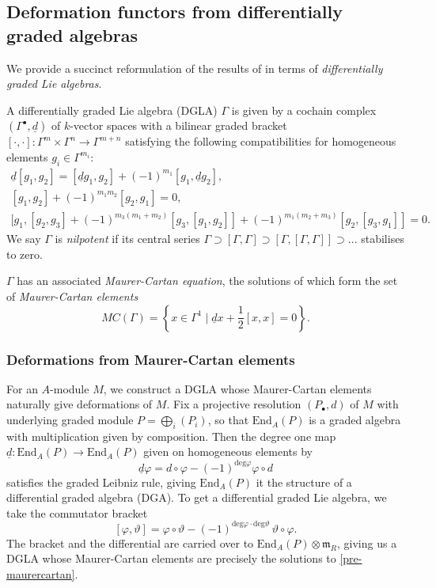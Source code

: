 \subsection{Deformation functors from differentially graded algebras}
\label{subsec-defbydga}
We provide a succinct reformulation of  the results of
 in terms of \textit{differentially graded Lie algebras}. 

\begin{definition} A differentially graded Lie algebra (DGLA) \(\Gamma\) 
    is given by a cochain complex \((\Gamma^\bullet,\underline{d})\) of \(k\)-vector
    spaces with a bilinear graded bracket \([\cdot,\cdot]: \Gamma^m \times \Gamma^n
    \rightarrow \Gamma^{m+n}\) satisfying the following compatibilities for
    homogeneous elements \(g_i\in \Gamma^{m_i}\): 
    \begin{gather*}
        \underline{d}[g_1,g_2] = [\underline{d}g_1,g_2] + (-1)^{m_1}
        [g_1,\underline{d}g_2],\\
        [g_1,g_2] + (-1)^{m_1m_2}[g_2,g_1]=0,\\
        [g_1,[g_2,g_3]+(-1)^{m_3(m_1+m_2)}[g_3,[g_1,g_2]] +
        (-1)^{m_1(m_2+m_3)}[g_2,[g_3,g_1]]=0.
    \end{gather*}
    We say \(\Gamma\) is \textit{nilpotent} if its central series
    \(\Gamma\supset [\Gamma,\Gamma]\supset [\Gamma,[\Gamma,\Gamma]]\supset ...\)
    stabilises to zero.  

    \(\Gamma\) has an associated \textit{Maurer-Cartan equation}, the solutions
    of which form the set of \textit{Maurer-Cartan elements} \[MC(\Gamma) =
    \left\{x\in \Gamma^1\;|\; \underline{d}x+\frac{1}{2}[x,x]=0\right\}.\]
\end{definition}

\subsubsection{Deformations from Maurer-Cartan elements} For an \(A\)-module
\(M\), we construct a DGLA whose Maurer-Cartan elements naturally give
deformations of \(M\). Fix a projective resolution \((P_\bullet,d)\) of \(M\)
with underlying graded module \(P=\bigoplus_i(P_i)\), so that
\(\text{End}_A(P)\) is a graded algebra with multiplication given by
composition. Then the degree one map \(\underline{d}:\text{End}_A(P)\rightarrow
\text{End}_A(P)\) given on homogeneous elements by 
\[\underline{d}\varphi = d \circ \varphi
-(-1)^{\text{deg}\varphi} \varphi \circ d\]
satisfies the graded Leibniz rule, giving \(\text{End}_A(P)\) it the structure
of a differential graded algebra (DGA). To get a differential graded Lie algebra, we
take the commutator bracket 
\[[\varphi, \vartheta] = \varphi\circ \vartheta -
(-1)^{\text{deg}\varphi\cdot \text{deg}\vartheta}\,\vartheta \circ \varphi.\]
The bracket and the differential are carried over to \(\text{End}_A(P)\otimes
\mathfrak{m}_R\), giving us a DGLA whose Maurer-Cartan elements are
precisely the solutions to \eqref{pre-maurercartan}. 

